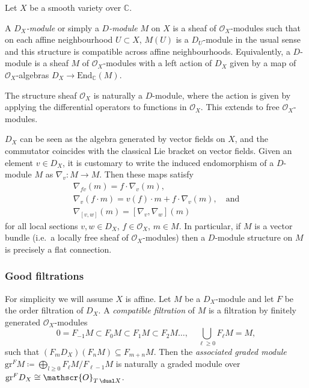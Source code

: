 Let \(X\) be a smooth variety over \(\mathbb{C}\). 

\begin{definition}
    A \emph{$D_X$-module} or simply a \emph{$D$-module} $M$ on \(X\) is a sheaf
    of \(\mathscr{O}_X\)-modules such that on each affine neighbourhood
    $U\subset X$, $M(U)$ is a $D_U$-module in the usual sense and this structure
    is compatible across affine neighbourhoods. Equivalently, a \(D\)-module is
    a sheaf \(M\) of \(\mathscr{O}_X\)-modules with a left action of \(D_X\)
    given by a map of \(\mathscr{O}_X\)-algebras \(D_X\rightarrow
    \text{End}_\mathbb{C}(M)\).
\end{definition}

\begin{example}
    The structure sheaf $\mathscr{O}_X$ is naturally a $D$-module, where the
    action is given by applying the differential operators to functions in
    $\mathscr{O}_X$. This extends to free \(\mathscr{O}_X\)-modules.
\end{example}

\begin{remark}
    \(D_X\) can be seen as the algebra generated by vector fields on \(X\), and
    the commutator coincides with the classical Lie bracket on vector fields.
    Given an element \(v\in D_X\), it is customary to write the induced
    endomorphism of a \(D\)-module \(M\) as \(\nabla_v: M\rightarrow M.\) Then
    these maps satisfy 
    \begin{gather*}
        \nabla_{fv}(m) = f\cdot \nabla_v (m) , \\
        \nabla_v(f\cdot m) = v(f) \cdot m + f\cdot \nabla_v(m),\quad
        \text{and}\\
        \nabla_{[v,w]}(m) = [\nabla_v, \nabla_w] (m)
    \end{gather*}
    for all local sections \(v,w\in D_X\), \(f\in \mathscr{O}_X\), \(m\in M\).
    In particular, if \(M\) is a vector bundle (i.e.\ a locally free sheaf of
    \(\mathscr{O}_X\)-modules) then a \(D\)-module structure on \(M\) is
    precisely a flat connection.
\end{remark}

\subsubsection{Good filtrations} For simplicity we will assume \(X\) is
affine. Let $M$ be a $D_X$-module and let $F$ be the order filtration of $D_X$.
A \emph{compatible filtration} of $M$ is a filtration by finitely generated
\(\mathscr{O}_X\)-modules
\begin{equation*}
    0=F_{-1}M\subset F_0 M \subset F_1 M \subset F_2 M\dots, \quad
    \bigcup_{\ell \geq 0} F_\ell M = M,
\end{equation*}
such that \((F_m D_X)(F_n M)\subseteq F_{m+n}M.\) 
Then the \emph{associated graded module} \(\text{gr}^FM\coloneqq
\bigoplus_{l\geq 0} F_\ell M / F_{\ell-1} M\) is naturally a graded module
over $\text{gr}^F D_X \cong \mathscr{O}_{T\,\dual X}$. 

